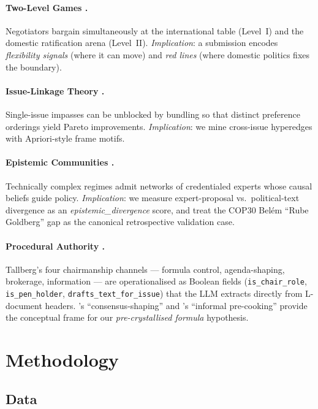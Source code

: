 \documentclass[11pt,a4paper]{article}
\begin{document}
\paragraph{Two-Level Games \citep{putnam1988}.}
Negotiators bargain simultaneously at the international table (Level~I) and the domestic ratification arena (Level~II). \emph{Implication}: a submission encodes \emph{flexibility signals} (where it can move) and \emph{red lines} (where domestic politics fixes the boundary).

\paragraph{Issue-Linkage Theory \citep{tollison1979,sebenius1983}.}
Single-issue impasses can be unblocked by bundling so that distinct preference orderings yield Pareto improvements. \emph{Implication}: we mine cross-issue hyperedges with Apriori-style frame motifs.

\paragraph{Epistemic Communities \citep{haas1992}.}
Technically complex regimes admit networks of credentialed experts whose causal beliefs guide policy. \emph{Implication}: we measure expert-proposal vs.\ political-text divergence as an \emph{epistemic\_divergence} score, and treat the COP30 Belém ``Rube Goldberg'' gap as the canonical retrospective validation case.

\paragraph{Procedural Authority \citep{tallberg2010,steinberg2002,goh2007}.}
Tallberg's four chairmanship channels --- formula control, agenda-shaping, brokerage, information --- are operationalised as Boolean fields (\texttt{is\_chair\_role}, \texttt{is\_pen\_holder}, \texttt{drafts\_text\_for\_issue}) that the LLM extracts directly from L-document headers. \citet{steinberg2002}'s ``consensus-shaping'' and \citet{goh2007}'s ``informal pre-cooking'' provide the conceptual frame for our \emph{pre-crystallised formula} hypothesis.

\section{Methodology}
\label{sec:method}

\subsection{Data}
\end{document}
